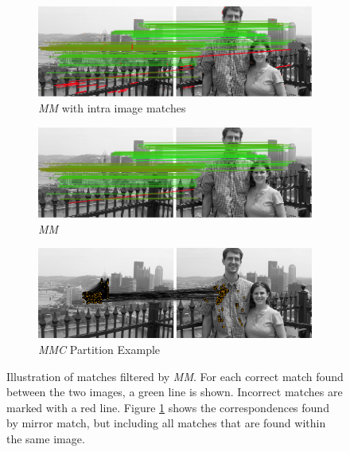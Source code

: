 \documentclass[conference]{IEEEtran}
\begin{document}
\begin{figure}
{\begin{subfigure}[t]{0.32\textwidth}
			\includegraphics[width=\textwidth]{images/mirror_match_with_pruned}
			\caption{\emph{MM} with intra image matches}
			\label{fig:within}
		\end{subfigure}%
		\enspace %
		\begin{subfigure}[t]{0.32\textwidth}
			\centering
			\includegraphics[width=\textwidth]{images/mirror_match}
			\caption{\emph{MM}}
			\label{fig:without}
		\end{subfigure}%
		\enspace%
		\begin{subfigure}[t]{0.32\textwidth}
			\centering
			\includegraphics[width=\textwidth]{images/MMC_partition}
			\caption{\emph{MMC} Partition Example}
			\label{fig:pitts_partition}
		\end{subfigure}%
	}%
	\caption{Illustration of matches filtered by \emph{MM}. For each 
	correct match found between the two images, a green line is shown.  
Incorrect matches are marked with a red line. Figure \ref{fig:within} 
shows the correspondences found by mirror match, but including all 
matches that are found within the same image. }%
	\label{fig:comparemirror}%
\end{figure}%
\end{document}
